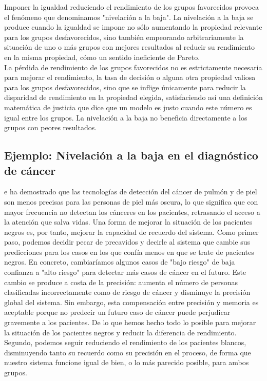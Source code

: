 Imponer la igualdad reduciendo el rendimiento de los grupos favorecidos provoca el fenómeno que denominamos "nivelación a la baja". La nivelación a la baja se produce cuando la igualdad se impone no sólo aumentando la propiedad relevante para los grupos desfavorecidos, sino también empeorando arbitrariamente la situación de uno o más grupos con mejores resultados al reducir su rendimiento en la misma propiedad, cómo un sentido ineficiente de Pareto.\\

La pérdida de rendimiento de los grupos favorecidos no es estrictamente necesaria para mejorar el rendimiento, la tasa de decisión o alguna otra propiedad valiosa para los grupos desfavorecidos, sino que se inflige únicamente para reducir la disparidad de rendimiento en la propiedad elegida, satisfaciendo así una definición matemática de justicia que dice que un modelo es justo cuando este número es igual entre los grupos. La nivelación a la baja no beneficia directamente a los grupos con peores resultados.\\


\subsection{Ejemplo: Nivelación a la baja en el diagnóstico de cáncer}
e ha demostrado que las tecnologías de detección del cáncer de pulmón y de piel son menos precisas para las personas de piel más oscura, lo que significa que con mayor frecuencia no detectan los cánceres en los pacientes, retrasando el acceso a la atención que salva vidas. Una forma de mejorar la situación de los pacientes negros es, por tanto, mejorar la capacidad de recuerdo del sistema. Como primer paso, podemos decidir pecar de precavidos y decirle al sistema que cambie sus predicciones para los casos en los que confía menos en que se trate de pacientes negros. En concreto, cambiaríamos algunos casos de "bajo riesgo" de baja confianza a "alto riesgo" para detectar más casos de cáncer en el futuro. Este cambio se produce a costa de la precisión: aumenta el número de personas clasificadas incorrectamente como de riesgo de cáncer y disminuye la precisión global del sistema. Sin embargo, esta compensación entre precisión y memoria es aceptable porque no predecir un futuro caso de cáncer puede perjudicar gravemente a los pacientes. De lo que hemos hecho todo lo posible para mejorar la situación de los pacientes negros y reducir la diferencia de rendimiento. Segundo, podemos seguir reduciendo el rendimiento de los pacientes blancos, disminuyendo tanto su recuerdo como su precisión en el proceso, de forma que nuestro sistema funcione igual de bien, o lo más parecido posible, para ambos grupos.\\

